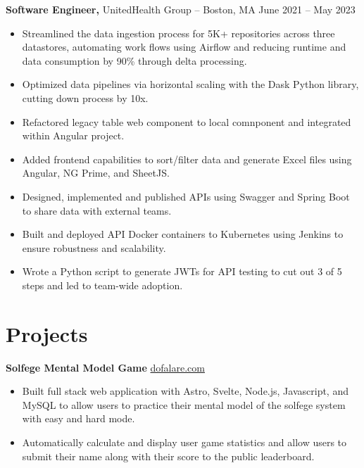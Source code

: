 \documentclass[11pt]{article}       %
\begin{document}
\textbf{Software Engineer,} {UnitedHealth Group} -- Boston, MA \hfill June 2021 -- May 2023 \\
\vspace{-9pt}
\begin{itemize}
  \item Streamlined the data ingestion process for 5K+ repositories across three datastores, automating work flows using Airflow and reducing runtime and data consumption by 90\% through delta processing.
  \item Optimized data pipelines via horizontal scaling with the Dask Python library, cutting down process by 10x.
  \item Refactored legacy table web component to local comnponent and integrated within Angular project.
  \item Added frontend capabilities to sort/filter data and generate Excel files using Angular, NG Prime, and SheetJS.
  \item Designed, implemented and published APIs using Swagger and Spring Boot to share data with external teams.
  \item Built and deployed API Docker containers to Kubernetes using Jenkins to ensure robustness and scalability.
  \item Wrote a Python script to generate JWTs for API testing to cut out 3 of 5 steps and led to team-wide adoption.
  
\end{itemize}


\vspace{-18.5pt}

\section*{Projects}
\textbf{Solfege Mental Model Game} \hfill \href{https://dofalare.com}{dofalare.com} \\
\vspace{-9pt}
\begin{itemize}
  \item Built full stack web application with Astro, Svelte, Node.js, Javascript, and MySQL to allow users to practice their mental model of the solfege system with easy and hard mode.
  \item Automatically calculate and display user game statistics and allow users to submit their name along with their score to the public leaderboard.
\end{itemize}
\end{document}
